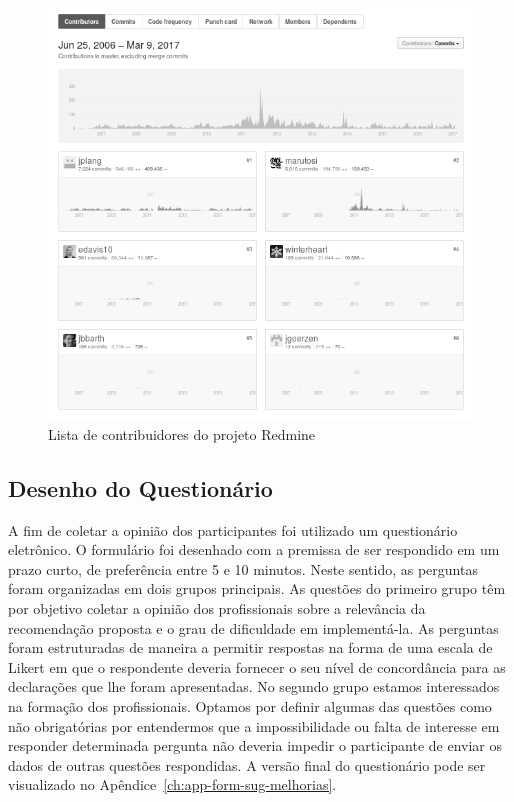 \begin{figure}[htpb]
	\centering
	\includegraphics[width=0.8\linewidth]{./chapter-sugestoes-melhorias-fgrm/img/redmine_contribuidores.png}
	\caption{Lista de contribuidores do projeto Redmine}
\label{fig:redmine_contribuidores}
\end{figure}

\subsection{Desenho do Questionário}
\label{ssub:sug_melhoria_desenho_questionario}

A fim de coletar a opinião dos participantes foi utilizado um questionário
eletrônico. O formulário foi desenhado com a premissa de ser respondido em um
prazo curto, de preferência entre 5 e 10 minutos. Neste sentido, as perguntas
foram organizadas em dois grupos principais. As questões do primeiro grupo têm
por objetivo coletar a opinião dos profissionais sobre a relevância da
recomendação proposta e o grau de dificuldade em implementá-la. As perguntas
foram estruturadas de maneira a permitir respostas na forma de uma escala de
Likert em que o respondente deveria fornecer o seu nível de concordância para as
declarações que lhe foram apresentadas. No segundo grupo estamos interessados na
formação dos profissionais. Optamos por definir algumas das questões como não
obrigatórias por entendermos que a impossibilidade ou falta de interesse em
responder determinada pergunta não deveria impedir o participante de enviar os
dados de outras questões respondidas. A versão final do questionário pode ser
visualizado no Apêndice~\ref{ch:app-form-sug-melhorias}.

